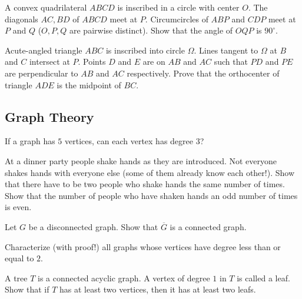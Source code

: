 \documentclass[12pt]{article}
\begin{document}
        \begin{exercise}
            A convex quadrilateral $ABCD$ is inscribed in a circle with center $O$. The diagonals $AC, BD$ of $ABCD$ meet at $P$. Circumcircles of $ABP$ and $CDP$ meet at $P$ and $Q$ ($O, P, Q$ are pairwise distinct). Show that the angle of $OQP$ is $90^{\circ}$. 
        \end{exercise}

        \begin{exercise}
            Acute-angled triangle $ABC$ is inscribed into circle $\Omega$. Lines tangent to $\Omega$ at $B$ and $C$ intersect at $P$. Points $D$ and $E$ are on $AB$ and $AC$ such that $PD$ and $PE$ are perpendicular to $AB$ and $AC$ respectively. Prove that the orthocenter of triangle $ADE$ is the midpoint of $BC$.
        \end{exercise}

    \subsection{Graph Theory}

        \begin{exercise}
        If a graph has $5$ vertices, can each vertex has degree $3$? 
        \end{exercise}
        
        \begin{exercise}
        At a dinner party people shake hands as they are introduced. Not everyone shakes hands with everyone else (some of them already know each other!). Show that there have to be two people who shake hands the same number of times. Show that the number of people who have shaken hands an odd number of times is even.
        \end{exercise}
        
        \begin{exercise}
        Let $G$ be a disconnected graph. Show that $\overline{G}$ is a connected graph.
        \end{exercise}
        
        \begin{exercise}
        Characterize (with proof!) all graphs whose vertices have degree less than or equal to $2$.
        \end{exercise}
        
        \begin{exercise}
        A tree $T$ is a connected acyclic graph. A vertex of degree $1$ in $T$ is called a leaf. Show that if $T$ has at least two vertices, then it has at least two leafs.  
        \end{exercise}
        
\end{document}
